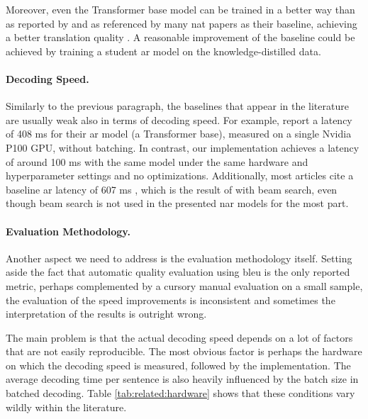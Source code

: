 Moreover, even the Transformer base model can be trained in a better way than
as reported by \citet{vaswani2017attention} and as referenced by many \ac{nat}
papers as their baseline, achieving a better translation quality
\citep{popel-bojar-2018-training}. A reasonable improvement of the baseline
could be achieved by training a student \ac{ar} model on the
knowledge-distilled data.

\paragraph{Decoding Speed.} Similarly to the previous paragraph, the baselines
that appear in the literature are usually weak also in terms of decoding speed.
For example, \citet{gu2017nonautoregressive} report a latency of 408 ms for
their \ac{ar} model (a Transformer base), measured on a single Nvidia P100 GPU,
without batching. In contrast, our implementation achieves a latency of around
100 ms with the same model under the same hardware and hyperparameter settings
and no optimizations. Additionally, most articles cite a baseline \ac{ar}
latency of 607 ms , which is the result of
\citet{gu2017nonautoregressive} with beam search, even though beam search is
not used in the presented \ac{nar} models for the most part.

\paragraph{Evaluation Methodology.} Another aspect we need to address is the
evaluation methodology itself. Setting aside the fact that automatic quality
evaluation using \acs{bleu} is the only reported metric, perhaps complemented
by a cursory manual evaluation on a small sample, the evaluation of the speed
improvements is inconsistent and sometimes the interpretation of the results is
outright wrong.

The main problem is that the actual decoding speed depends on a lot of factors
that are not easily reproducible. The most obvious factor is perhaps the
hardware on which the decoding speed is measured, followed by the
implementation. The average decoding time per sentence is also heavily
influenced by the batch size in batched decoding. Table
\ref{tab:related:hardware} shows that these conditions vary wildly within the
literature.

